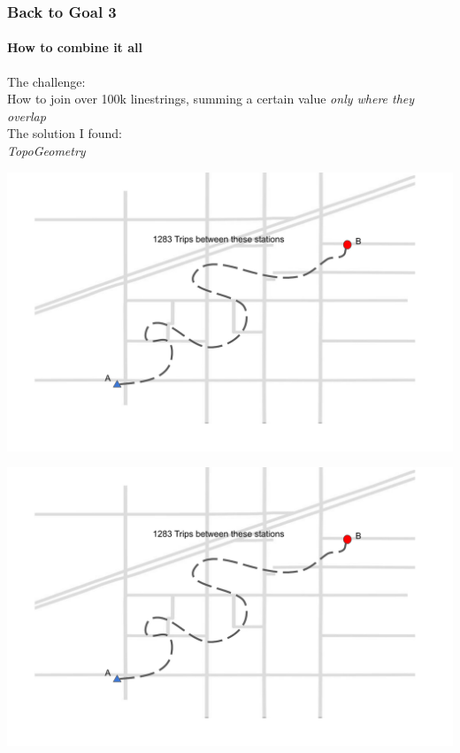 \documentclass{beamer}
\begin{document}
\begin{frame}
    \frametitle{Back to Goal 3}
    \framesubtitle{How to combine it all}

    The challenge: \pause
    \\
    How to join over 100k linestrings, summing a certain value \emph{only where they overlap} \pause
    \\
    
    The solution I found: \pause
    \\
    \emph{TopoGeometry}
\end{frame}
\begin{frame}
    \includegraphics[width=\textwidth,page=4]{graphics_document.pdf}
\end{frame}
\begin{frame}
    \includegraphics[width=\textwidth,page=5]{graphics_document.pdf}
\end{frame}
\end{document}

